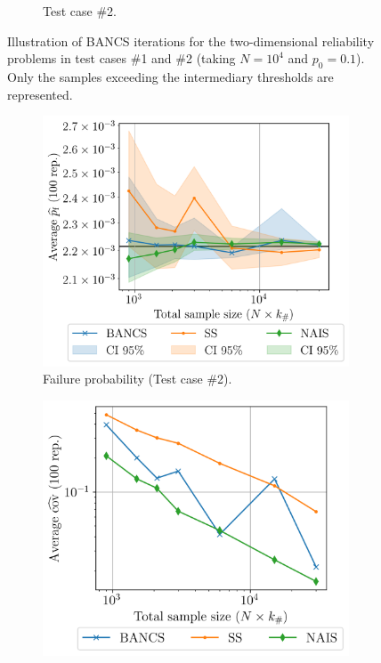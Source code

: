 \begin{figure}
\begin{subfigure}[b]{0.48\linewidth}
        \caption{Test case \#2.}
    \end{subfigure}
    \caption{Illustration of BANCS iterations for the two-dimensional reliability problems in test cases \#1 and \#2  (taking $N=10^4$ and $p_0=0.1$). 
    Only the samples exceeding the intermediary thresholds are represented.}
    \label{fig:2D_toycase_reliability}
\end{figure}



\begin{figure}
    \centering
    \begin{subfigure}[b]{0.49\linewidth}
        \centering
        \includegraphics[width=\linewidth]{part3/figures/BANCS/RP4B_mean.png}
        \caption{Failure probability (Test case \#2).}
    \end{subfigure}
    \begin{subfigure}[b]{0.47\linewidth}
        \centering
        \includegraphics[width=\linewidth]{part3/figures/BANCS/RP4B_cov.png}

\end{subfigure}
\end{figure}
